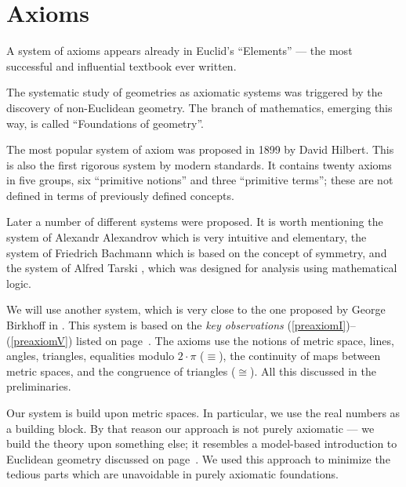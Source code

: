 \chapter{Axioms}
\label{chap:axioms}


\vfill

A system of axioms appears already in Euclid's ``Elements'' --- the most successful and influential textbook ever written.

The systematic study of geometries as axiomatic systems
 was
triggered by the discovery of non-Euclidean geometry.
The branch of mathematics, emerging this way, is called ``Foundations of geometry''.

The most popular system of axiom
was proposed in 1899 by David Hilbert.
This is also the first rigorous system by modern standards.
It contains twenty axioms in five groups, six ``primitive notions'' and three ``primitive terms'';
these are not defined in terms of previously defined concepts.

Later a number of different systems were proposed.
It is worth mentioning
the system of Alexandr Alexandrov \cite{alexandrov} which is very intuitive and elementary, 
the system of Friedrich Bachmann \cite{bachmann} which is based on the concept of symmetry,
and the system of Alfred Tarski \cite{tarski}, which was designed for analysis using mathematical logic.

We will use another system,
which is very close to the one proposed by George Birkhoff in \cite{birkhoff}.
This system is based on the {}\emph{key observations}  (\ref{preaxiomI})--(\ref{preaxiomV}) listed on page~\pageref{preaxiomI}.
The axioms use the notions of 
metric space, 
lines, 
angles,
triangles,
equalities modulo $2\cdot\pi$ ($\equiv$), 
the continuity of maps between metric spaces,
and the congruence of triangles ($\cong$).
All this discussed in the preliminaries.

Our system is build upon metric spaces.
In particular, we use the real numbers as a building block. 
By that reason our approach is not purely axiomatic --- we build the theory upon something else;
it resembles a model-based introduction to Euclidean geometry discussed on page~\pageref{page:model}.
We used this approach to minimize the tedious parts which are unavoidable in purely axiomatic foundations.

